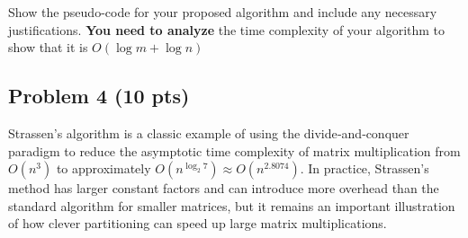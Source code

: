 \documentclass[12pt]{article}
\begin{document}
Show the pseudo-code for your proposed algorithm and include any necessary justifications. \textbf{You need to analyze} the time complexity of your algorithm to show that it is $O(\log m + \log n)$

\subsection*{Problem 4 (10 pts)}
Strassen’s algorithm is a classic example of using the divide‐and‐conquer paradigm to reduce the asymptotic time complexity of matrix multiplication from $O(n^3)$ to approximately $O(n^{\log_2 7}) \approx O(n^{2.8074})$. In practice, Strassen’s method has larger constant factors and can introduce more overhead than the standard algorithm for smaller matrices, but it remains an important illustration of how clever partitioning can speed up large matrix multiplications.\\
\end{document}
